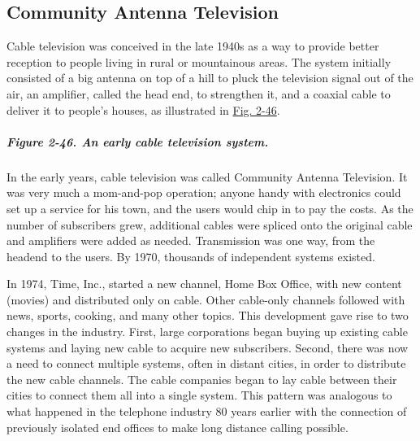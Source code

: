 \documentclass[b5paper,11pt]{memoir}
\begin{document}
\protect\hypertarget{0130661023_ch02lev1sec7.htmlux5cux23ch02lev2sec25}{}{}

\subsection{Community Antenna Television}

Cable television was conceived in the late 1940s as a way to provide
better reception to people living in rural or mountainous areas. The
system initially consisted of a big antenna on top of a hill to pluck
the television signal out of the air, an amplifier, called the {head
end}, to strengthen it, and a coaxial cable to deliver it to people's
houses, as illustrated in
\protect\hyperlink{0130661023_ch02lev1sec7.htmlux5cux23ch02fig46}{Fig.
2-46}.

\subparagraph[Figure 2-46. An early cable television
system.]{\texorpdfstring{\protect\hypertarget{0130661023_ch02lev1sec7.htmlux5cux23ch02fig46}{}{}Figure
2-46. An early cable television
system.}{Figure 2-46. An early cable television system.}}


In the early years, cable television was called {Community Antenna
Television}. It was very much a mom-and-pop operation; anyone handy with
electronics could set up a service for his town, and the users would
chip in to pay the costs. As the number of subscribers grew, additional
cables were spliced onto the original cable and amplifiers were added as
needed. Transmission was one way, from the headend to the users. By
1970, thousands of independent systems existed.

In 1974, Time, Inc., started a new channel, Home Box Office, with new
content (movies) and distributed only on cable. Other cable-only
channels followed with news, sports, cooking, and many other topics.
This development gave rise to two changes in the industry. First, large
corporations began buying up existing cable systems and laying new cable
to acquire new subscribers. Second, there was now a need to connect
multiple systems, often in distant cities, in order to distribute the
new cable channels. The cable companies began to lay cable between their
cities to connect them all into a single system. This pattern was
analogous to what happened in the telephone industry 80 years earlier
with the connection of previously isolated end offices to make long
distance calling possible.

\protect\hypertarget{0130661023_ch02lev1sec7.htmlux5cux23ch02lev2sec26}{}{}
\end{document}
